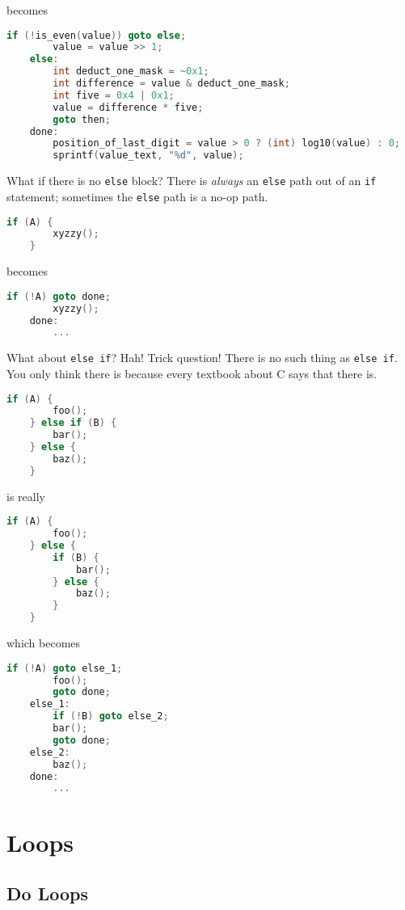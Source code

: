 \documentclass{article}
\begin{document}
becomes

\begin{lstlisting}[language=C]
        if (!is_even(value)) goto else;
        value = value >> 1;
    else:
        int deduct_one_mask = ~0x1;
        int difference = value & deduct_one_mask;
        int five = 0x4 | 0x1;
        value = difference * five;
        goto then;
    done:
        position_of_last_digit = value > 0 ? (int) log10(value) : 0;
        sprintf(value_text, "%d", value);
\end{lstlisting}

What if there is no \lstinline{else} block?
There is \textit{always} an \lstinline{else} path out of an \lstinline{if} statement;
sometimes the \lstinline{else} path is a no-op path.

\begin{lstlisting}[language=C]
    if (A) {
        xyzzy();
    }
\end{lstlisting}

becomes

\begin{lstlisting}[language=C]
        if (!A) goto done;
        xyzzy();
    done:
        ...
\end{lstlisting}

What about \lstinline{else if}?
Hah!
Trick question!
There is no such thing as \lstinline{else if}.
You only think there is because every textbook about C says that there is.

\begin{lstlisting}[language=C]
    if (A) {
        foo();
    } else if (B) {
        bar();
    } else {
        baz();
    }
\end{lstlisting}
is really
\begin{lstlisting}[language=C]
    if (A) {
        foo();
    } else {
        if (B) {
            bar();
        } else {
            baz();
        }
    }
\end{lstlisting}
which becomes
\begin{lstlisting}[language=C]
        if (!A) goto else_1;
        foo();
        goto done;
    else_1:
        if (!B) goto else_2;
        bar();
        goto done;
    else_2:
        baz();
    done:
        ...
\end{lstlisting}

\section{Loops}

\subsection{Do Loops}
\end{document}
